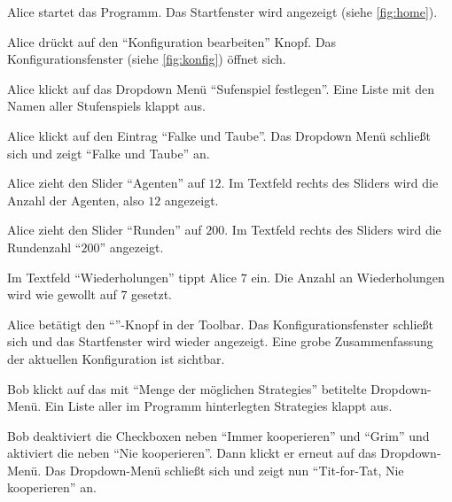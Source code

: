 \documentclass[parskip=full,11pt]{scrartcl}
\begin{document}

{Alice startet das Programm.}
{Das Startfenster wird angezeigt (siehe \cref{fig:home}).}

{Alice drückt auf den \enquote{\Gls{Konfiguration} bearbeiten} Knopf.}
{Das Konfigurationsfenster (siehe \cref{fig:konfig}) öffnet sich.}

{Alice klickt auf das Dropdown Menü \enquote{Sufenspiel festlegen}.}
{Eine Liste mit den Namen aller \Glspl{Stufenspiel} klappt aus.}

{Alice klickt auf den Eintrag \enquote{Falke und Taube}.}
{Das Dropdown Menü schließt sich und zeigt \enquote{Falke und Taube} an.}

{Alice zieht den Slider \enquote{Agenten} auf \(12\).}
{Im Textfeld rechts des Sliders wird die Anzahl der Agenten, also \(12\) angezeigt.}

{Alice zieht den Slider \enquote{Runden} auf \(200\).}%
{Im Textfeld rechts des Sliders wird die Rundenzahl \enquote{\(200\)} angezeigt.}

{Im Textfeld \enquote{Wiederholungen} tippt Alice \(7\) ein.}
{Die Anzahl an Wiederholungen wird wie gewollt auf \(7\) gesetzt.}

{Alice betätigt den \enquote{\checkmark}-Knopf in der Toolbar.}
{Das Konfigurationsfenster schließt sich und das Startfenster wird wieder angezeigt. Eine grobe Zusammenfassung der aktuellen \Gls{Konfiguration} ist sichtbar.}

{Bob klickt auf das mit \enquote{Menge der möglichen \Glspl{Strategie}} betitelte Dropdown-Menü.}
{Ein Liste aller im Programm hinterlegten \Glspl{Strategie} klappt aus.}

{Bob deaktiviert die Checkboxen neben \enquote{Immer kooperieren} und \enquote{Grim} und aktiviert die neben \enquote{Nie kooperieren}. Dann klickt er erneut auf das Dropdown-Menü.}
{Das Dropdown-Menü schließt sich und zeigt nun \enquote{Tit-for-Tat, Nie kooperieren} an.}
\end{document}
